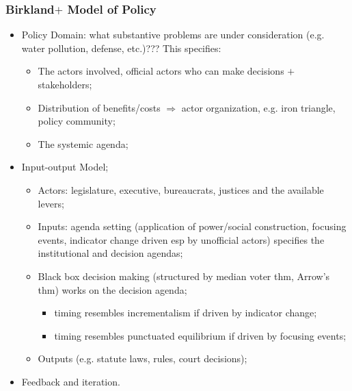 \documentclass[aspectratio=169]{beamer}
\theoremstyle{principle}
\begin{document}
\begin{frame}
\frametitle{Birkland$+$ Model of Policy}
\begin{itemize}
\item Policy Domain: what substantive problems are under consideration (e.g. water pollution, defense, etc.)???  This specifies:
\begin{itemize}
\item The actors involved, official actors who can make decisions $+$ stakeholders; 
\item Distribution of benefits/costs $\Rightarrow$ actor organization, e.g. iron triangle, policy community;
\item The systemic agenda; 
\end{itemize} 
\bigskip
\item \color{black}Input-output Model;
\begin{itemize}
\item Actors: legislature, executive, bureaucrats, justices and the available levers;
\item Inputs: agenda setting (application of power/social construction, focusing events, indicator change driven esp by unofficial actors) specifies the institutional and decision agendas;
\item Black box decision making (structured by median voter thm, Arrow's thm) works on the decision agenda;
\begin{itemize}
\item timing resembles incrementalism if driven by indicator change;
\item timing resembles punctuated equilibrium if driven by focusing events;
 \end{itemize}
\item Outputs (e.g. statute laws, rules, court decisions);
\end{itemize}
\bigskip
\item Feedback and iteration.
\end{itemize}
\end{frame}
\end{document}
